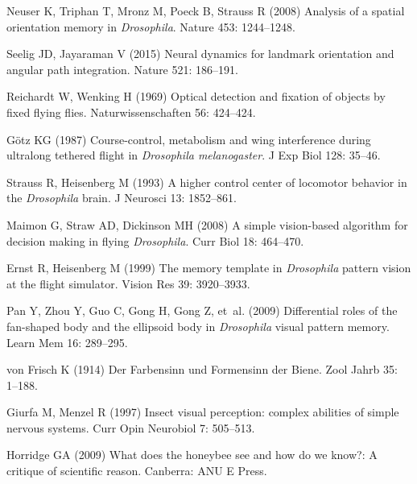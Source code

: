 \begin{thebibliography}{10}
	Neuser K, Triphan T, Mronz M, Poeck B, Strauss R (2008) Analysis of a spatial
	orientation memory in \emph{Drosophila}.
	\newblock Nature 453: 1244--1248.
	
	Seelig JD, Jayaraman V (2015) Neural dynamics for landmark orientation and
	angular path integration.
	\newblock Nature 521: 186--191.
	
	Reichardt W, Wenking H (1969) Optical detection and fixation of objects by
	fixed flying flies.
	\newblock Naturwissenschaften 56: 424--424.
	
	G{\"o}tz KG (1987) Course-control, metabolism and wing interference during
	ultralong tethered flight in \emph{Drosophila melanogaster}.
	\newblock J Exp Biol 128: 35--46.
	
	Strauss R, Heisenberg M (1993) A higher control center of locomotor behavior in
	the \emph{Drosophila} brain.
	\newblock J Neurosci 13: 1852--861.
	
	Maimon G, Straw AD, Dickinson MH (2008) A simple vision-based algorithm for
	decision making in flying \emph{Drosophila}.
	\newblock Curr Biol 18: 464--470.
	
	Ernst R, Heisenberg M (1999) The memory template in \emph{Drosophila} pattern
	vision at the flight simulator.
	\newblock Vision Res 39: 3920--3933.
	
	Pan Y, Zhou Y, Guo C, Gong H, Gong Z, et~al. (2009) {Differential roles of the
		fan-shaped body and the ellipsoid body in {\emph{Drosophila}} visual pattern
		memory}.
	\newblock Learn Mem 16: 289--295.
	
	von Frisch K (1914) {Der Farbensinn und Formensinn der Biene}.
	\newblock Zool Jahrb 35: 1--188.
	
	Giurfa M, Menzel R (1997) Insect visual perception: complex abilities of simple
	nervous systems.
	\newblock Curr Opin Neurobiol 7: 505--513.
	
	Horridge GA (2009) What does the honeybee see and how do we know?: A critique
	of scientific reason.
	\newblock Canberra: ANU E Press.
	

\end{thebibliography}
